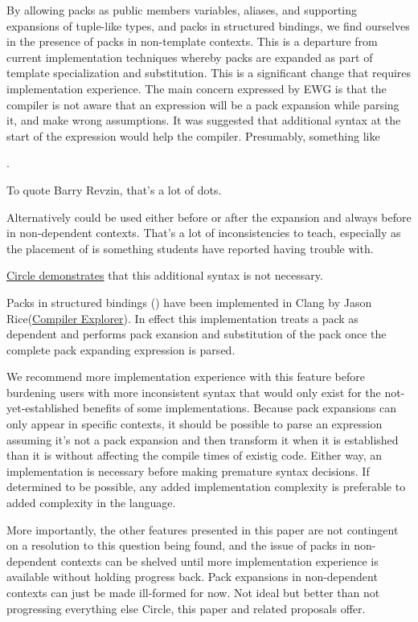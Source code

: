 \documentclass{wg21}
\begin{document}
By allowing packs as public members variables, aliases, and supporting expansions of tuple-like types,
and packs in structured bindings, we find ourselves in the presence of packs in non-template contexts.
This is a departure from current implementation techniques whereby packs are expanded as part of template specialization and substitution.
This is a significant change that requires implementation experience.
The main concern expressed by EWG is that the compiler is not aware that an expression will be a pack expansion while parsing it,
and make wrong assumptions.
It was suggested that additional syntax at the start of the expression would help the compiler. Presumably, something like

.

To quote Barry Revzin, that's a lot of dots.

Alternatively  could be used either before or after the expansion and always before in non-dependent contexts. That's a lot of inconsistencies to teach, especially as the placement of  is something students have reported having trouble with.

\href{https://godbolt.org/z/9ef4r69Wh}{Circle demonstrates} that this additional syntax is not necessary.

Packs in structured bindings () have been implemented in Clang by Jason Rice(\href{https://godbolt.org/z/Tnz4e1dY9}{Compiler Explorer}). In effect this implementation treats a pack as dependent and performs
pack exansion and substitution of the pack once the complete pack expanding expression is parsed.

We recommend more implementation experience with this feature before burdening users with more inconsistent syntax
that would only exist for the not-yet-established benefits of some implementations.
Because pack expansions can only appear in specific contexts, it should be possible to parse an expression
assuming it's not a pack expansion and then transform it when it is established than it is without affecting the compile times of existig code.
Either way, an implementation is necessary before making premature syntax decisions.
If determined to be possible, any added implementation complexity is preferable to added complexity in the language.

More importantly, the other features presented in this paper are not contingent on a resolution to this question being found, and the issue of packs in non-dependent contexts can be shelved until more implementation experience is available without holding progress back.
Pack expansions in non-dependent contexts can just be made ill-formed for now. Not ideal but better than not progressing everything else Circle, this paper and related proposals offer.
\end{document}
